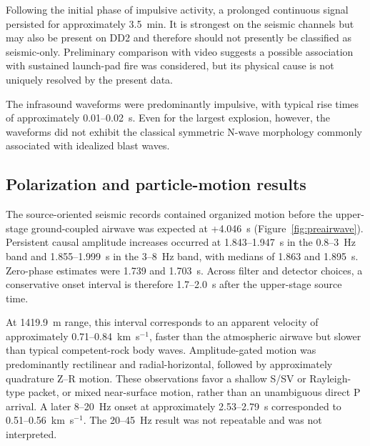 \documentclass[]{seismica}
\begin{document}
Following the initial phase of impulsive activity, a prolonged continuous
signal persisted for approximately 3.5~min. It is strongest on the seismic
channels but may also be present on DD2 and therefore should not presently be
classified as seismic-only. Preliminary comparison with video suggests a
possible association with sustained launch-pad fire was considered, but its
physical cause is not uniquely resolved by the present data.

The infrasound waveforms were predominantly impulsive, with typical rise times of approximately 0.01--0.02~s. Even for the largest explosion, however, the waveforms did not exhibit the classical symmetric N-wave morphology commonly associated with idealized blast waves.


\subsection{Polarization and particle-motion results}
\label{sec:results_polarization}

The source-oriented seismic records contained organized motion before the
upper-stage ground-coupled airwave was expected at +4.046~s
(Figure~\ref{fig:preairwave}). Persistent causal amplitude increases occurred
at 1.843--1.947~s in the 0.8--3~Hz band and 1.855--1.999~s in the 3--8~Hz
band, with medians of 1.863 and 1.895~s. Zero-phase estimates were 1.739 and
1.703~s. Across filter and detector choices, a conservative onset interval is
therefore 1.7--2.0~s after the upper-stage source time.

At 1419.9~m range, this interval corresponds to an apparent velocity of
approximately 0.71--0.84~km~s$^{-1}$, faster than the atmospheric airwave but
slower than typical competent-rock body waves. Amplitude-gated motion was
predominantly rectilinear and radial-horizontal, followed by approximately
quadrature Z--R motion. These observations favor a shallow S/SV or
Rayleigh-type packet, or mixed near-surface motion, rather than an unambiguous
direct P arrival. A later 8--20~Hz onset at approximately 2.53--2.79~s
corresponded to 0.51--0.56~km~s$^{-1}$. The 20--45~Hz result was not
repeatable and was not interpreted.
\end{document}
